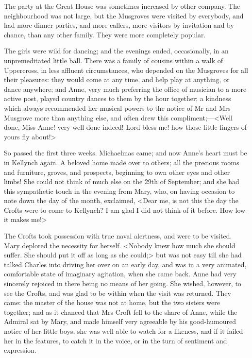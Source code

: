 The party at the Great House was sometimes increased by other company. The neighbourhood was not large, but the Musgroves were visited by everybody, and had more dinner-parties, and more callers, more visitors by invitation and by chance, than any other family. They were more completely popular.

The girls were wild for dancing; and the evenings ended, occasionally, in an unpremeditated little ball. There was a family of cousins within a walk of Uppercross, in less affluent circumstances, who depended on the Musgroves for all their pleasures: they would come at any time, and help play at anything, or dance anywhere; and Anne, very much preferring the office of musician to a more active post, played country dances to them by the hour together; a kindness which always recommended her musical powers to the notice of Mr and Mrs Musgrove more than anything else, and often drew this compliment;—<Well done, Miss Anne! very well done indeed! Lord bless me! how those little fingers of yours fly about!>

So passed the first three weeks. Michaelmas came; and now Anne's heart must be in Kellynch again. A beloved home made over to others; all the precious rooms and furniture, groves, and prospects, beginning to own other eyes and other limbs! She could not think of much else on the 29th of September; and she had this sympathetic touch in the evening from Mary, who, on having occasion to note down the day of the month, exclaimed, <Dear me, is not this the day the Crofts were to come to Kellynch? I am glad I did not think of it before. How low it makes me!>

The Crofts took possession with true naval alertness, and were to be visited. Mary deplored the necessity for herself. <Nobody knew how much she should suffer. She should put it off as long as she could;> but was not easy till she had talked Charles into driving her over on an early day, and was in a very animated, comfortable state of imaginary agitation, when she came back. Anne had very sincerely rejoiced in there being no means of her going. She wished, however, to see the Crofts, and was glad to be within when the visit was returned. They came: the master of the house was not at home, but the two sisters were together; and as it chanced that Mrs Croft fell to the share of Anne, while the Admiral sat by Mary, and made himself very agreeable by his good-humoured notice of her little boys, she was well able to watch for a likeness, and if it failed her in the features, to catch it in the voice, or in the turn of sentiment and expression.

